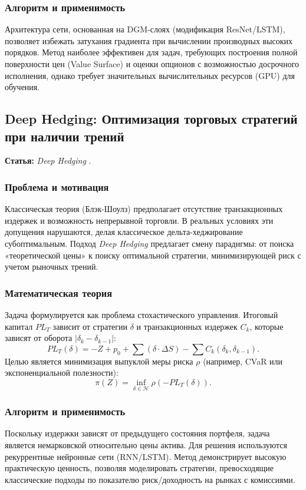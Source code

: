 \subsubsection{Алгоритм и применимость}
Архитектура сети, основанная на DGM-слоях (модификация ResNet/LSTM), позволяет избежать затухания градиента при вычислении производных высоких порядков. Метод наиболее эффективен для задач, требующих построения полной поверхности цен (Value Surface) и оценки опционов с возможностью досрочного исполнения, однако требует значительных вычислительных ресурсов (GPU) для обучения.

\subsection{Deep Hedging: Оптимизация торговых стратегий при наличии трений}
\textbf{Статья:} \textit{Deep Hedging} \cite{Buehler2019}.

\subsubsection{Проблема и мотивация}
Классическая теория (Блэк-Шоулз) предполагает отсутствие транзакционных издержек и возможность непрерывной торговли. В реальных условиях эти допущения нарушаются, делая классическое дельта-хеджирование субоптимальным. Подход \textit{Deep Hedging} предлагает смену парадигмы: от поиска «теоретической цены» к поиску оптимальной стратегии, минимизирующей риск с учетом рыночных трений.

\subsubsection{Математическая теория}
Задача формулируется как проблема стохастического управления. Итоговый капитал $PL_T$ зависит от стратегии $\delta$ и транзакционных издержек $C_k$, которые зависят от оборота $|\delta_k - \delta_{k-1}|$:
\begin{equation}
    PL_T(\delta) = -Z + p_0 + \sum (\delta \cdot \Delta S) - \sum C_k(\delta_k, \delta_{k-1}).
\end{equation}
Целью является минимизация выпуклой меры риска $\rho$ (например, CVaR или экспоненциальной полезности):
\begin{equation}
    \pi(Z) = \inf_{\delta \in \mathcal{H}} \rho \left( - PL_T(\delta) \right).
\end{equation}

\subsubsection{Алгоритм и применимость}
Поскольку издержки зависят от предыдущего состояния портфеля, задача является немарковской относительно цены актива. Для решения используются рекуррентные нейронные сети (RNN/LSTM). Метод демонстрирует высокую практическую ценность, позволяя моделировать стратегии, превосходящие классические подходы по показателю риск/доходность на рынках с комиссиями.

